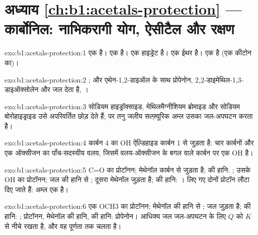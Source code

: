\section*{अध्याय \ref{ch:b1:acetals-protection} --- कार्बोनिल: नाभिकरागी योग, ऐसीटैल और रक्षण}

\begin{solution}{exo:b1:acetals-protection:1}
 एक  है।  एक  है।
 एक हाइड्रेट है।  एक ईथर है। 
एक  है (एक कीटोन का)।
\end{solution}

\begin{solution}{exo:b1:acetals-protection:2}
; और एथेन-1,2-डाइऑल के साथ
प्रोपेनोन, 2,2-डाइमेथिल-1,3-डाइऑक्सोलेन और जल देता है,
।
\end{solution}

\begin{solution}{exo:b1:acetals-protection:3}
सोडियम हाइड्रॉक्साइड, मेथिलमैग्नीशियम ब्रोमाइड और सोडियम बोरोहाइड्राइड उसे
अपरिवर्तित छोड़ देते हैं; पर तनु जलीय सल्फ़्यूरिक अम्ल उसका जल-अपघटन करता है।
\end{solution}

\begin{solution}{exo:b1:acetals-protection:4}
कार्बन 4 का OH ऐल्डिहाइड कार्बन 1 से जुड़ता है: चार कार्बनों और एक ऑक्सीजन का
पाँच-सदस्यीय वलय, जिसमें वलय-ऑक्सीजन के बगल वाले कार्बन पर एक OH
है।
\end{solution}

\begin{solution}{exo:b1:acetals-protection:5}
C=O का प्रोटॉनन; मेथेनॉल कार्बन से जुड़ता है;  की हानि: ;
उसके OH का प्रोटॉनन; जल की हानि से ; दूसरा मेथेनॉल
जुड़ता है;  की हानि: । लिए गए दोनों प्रोटॉन
लौटा दिए जाते हैं: अम्ल एक  है।
\end{solution}

\begin{solution}{exo:b1:acetals-protection:6}
एक OCH3 का प्रोटॉनन; मेथेनॉल की हानि से ; जल जुड़ता है;
 की हानि: ; प्रोटॉनन, मेथेनॉल की हानि,  की हानि:
प्रोपेनोन। आधिक्य जल जल-अपघटन के लिए $Q$ को $K$ से नीचे रखता है, और वह
पूर्णता तक चलता है।
\end{solution}

